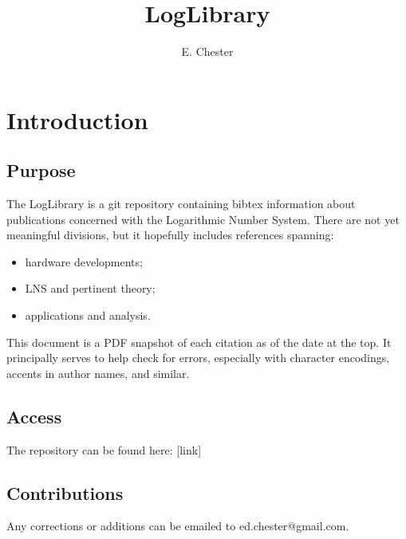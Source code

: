 \documentclass{article}
\title{LogLibrary}
\author{E. Chester}
\begin{document}
\maketitle
\section{Introduction}
\subsection{Purpose}
The LogLibrary is a git repository containing bibtex information about publications concerned with the Logarithmic Number System. There are not yet meaningful divisions, but it hopefully includes references spanning:
\begin{itemize}
    \item hardware developments;
    \item LNS and pertinent theory;
    \item applications and analysis.
\end{itemize}
This document is a PDF snapshot of each citation as of the date at the top. It principally serves to help check for errors, especially with character encodings, accents in author names, and similar.
\subsection{Access}
The repository can be found here: 
[link]
\subsection{Contributions}
Any corrections or additions can be emailed to ed.chester@gmail.com.



\nocite{*}
\end{document}
